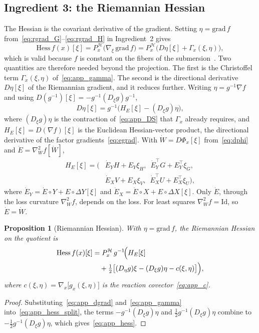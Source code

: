 \documentclass[letterpaper, 10 pt, conference]{ieeeconf}
\newcommand{\cH}{\mathcal{H}}
\newcommand{\Had}{\circ}
\theoremstyle{plain}
\newtheorem{proposition}{Proposition}
\theoremstyle{definition}
\theoremstyle{remark}
\begin{document}
\subsection{Ingredient 3: the Riemannian Hessian}
The Hessian is the covariant derivative of the gradient. Setting $\eta=\mathrm{grad}\,f$ from~\eqref{eq:rgrad_G}--\eqref{eq:rgrad_H} in Ingredient~2 gives
\begin{equation}
  \mathrm{Hess}\,f(x)[\xi] = P_x^{\cH}\big(\nabla_\xi\,\mathrm{grad}\,f\big) = P_x^{\cH}\big(D\eta[\xi] + \Gamma_x(\xi,\eta)\big),
  \label{eq:app_hess_split}
\end{equation}
which is valid because $f$ is constant on the fibers of the submersion~\cite{absilbook,boumal2023introduction}. Two quantities are therefore needed beyond the projection. The first is the Christoffel term $\Gamma_x(\xi,\eta)$ of~\eqref{eq:app_gamma}. The second is the directional derivative $D\eta[\xi]$ of the Riemannian gradient, and it reduces further. Writing $\eta=g^{-1}\nabla f$ and using $D(g^{-1})[\xi]=-g^{-1}(D_\xi g)g^{-1}$,
\begin{equation}
  D\eta[\xi] = g^{-1}\big(H_E[\xi] - (D_\xi g)\eta\big),
  \label{eq:app_dgrad}
\end{equation}
where $(D_\xi g)\eta$ is the contraction of~\eqref{eq:app_DS} that $\Gamma_x$ already requires, and $H_E[\xi]=D(\nabla f)[\xi]$ is the Euclidean Hessian-vector product, the directional derivative of the factor gradients~\eqref{eq:egrad}. With $\dot W = D\Phi_x[\xi]$ from~\eqref{eq:dphi} and $\dot E = \nabla^2_W f[\dot W]$,
\begin{align*}
  H_E[\xi] = \big(&\dot E_Y H + E_Y\xi_H,\;\ \dot E_Y^\top G + E_Y^\top\xi_G, \\
  &\dot E_X V + E_X\xi_V,\;\ \dot E_X^\top U + E_X^\top\xi_U\big),
\end{align*}
where $\dot E_Y = \dot E\Had Y + E\Had\Delta Y[\xi]$ and $\dot E_X = \dot E\Had X + E\Had\Delta X[\xi]$. Only $\dot E$, through the loss curvature $\nabla^2_W f$, depends on the loss. For least squares $\nabla^2_W f=\mathrm{Id}$, so $\dot E=\dot W$.

\begin{proposition}[Riemannian Hessian]\label{prop:hess}
With $\eta=\mathrm{grad}\,f$, the Riemannian Hessian on the quotient is
\begin{align}
  \mathrm{Hess}\,f(x)[\xi] &= P_x^{\cH}\,g^{-1}\!\Big(H_E[\xi] \notag\\
  &\quad + \tfrac12\big[(D_\eta g)\xi - (D_\xi g)\eta - c(\xi,\eta)\big]\Big),
  \label{eq:app_hess}
\end{align}
where $c(\xi,\eta)=\nabla_x\!\big[g_x(\xi,\eta)\big]$ is the reaction covector~\eqref{eq:app_c}.
\end{proposition}
\begin{proof}
Substituting~\eqref{eq:app_dgrad} and~\eqref{eq:app_gamma} into~\eqref{eq:app_hess_split}, the terms $-g^{-1}(D_\xi g)\eta$ and $\tfrac12 g^{-1}(D_\xi g)\eta$ combine to $-\tfrac12 g^{-1}(D_\xi g)\eta$, which gives~\eqref{eq:app_hess}.
\end{proof}
\end{document}
